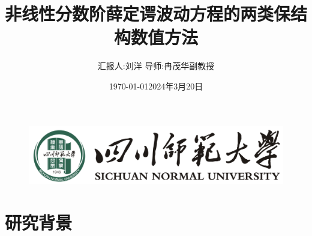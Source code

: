 \documentclass[aspectratio=169]{beamer}
\title[非线性分数阶薛定谔波动方程的两类保结构数值方法
]{非线性分数阶薛定谔波动方程的两类保结构数值方法}
\author[刘洋]{\footnotesize 汇报人:刘洋 \quad 导师:冉茂华\quad 副教授}
\institute[计算数学]{\footnotesize 计算数学}
\date{\footnotesize \vskip -10pt \today}
\date{2024年3月20日}
\numberwithin{theorem}{section} %
\numberwithin{equation}{section}%
\numberwithin{figure}{section}%
\numberwithin{table}{section}%
\begin{document}
\kaishu
\begin{frame}
	\titlepage
	\vspace{-2mm}
	\begin{figure}[htpb]
		\begin{center}
			\includegraphics[width=0.45\linewidth]{pic/SICNU_Logo2.png}
		\end{center}
	\end{figure}
\end{frame}
\begin{frame}
\tableofcontents[sectionstyle=show,subsectionstyle=show/shaded/hide,subsubsectionstyle=show/shaded/hide]
\end{frame}

\section{研究背景}

\end{document}
